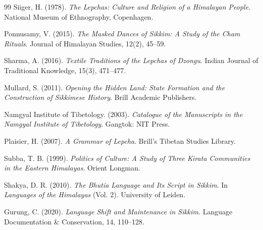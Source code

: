 \documentclass[12pt]{article}
\begin{document}
\begin{thebibliography}{99}
 Siiger, H. (1978). \textit{The Lepchas: Culture and Religion of a Himalayan People}. National Museum of Ethnography, Copenhagen.

 Ponnusamy, V. (2015). \textit{The Masked Dances of Sikkim: A Study of the Cham Rituals}. Journal of Himalayan Studies, 12(2), 45–59.

 Sharma, A. (2016). \textit{Textile Traditions of the Lepchas of Dzongu}. Indian Journal of Traditional Knowledge, 15(3), 471–477.

 Mullard, S. (2011). \textit{Opening the Hidden Land: State Formation and the Construction of Sikkimese History}. Brill Academic Publishers.

 Namgyal Institute of Tibetology. (2003). \textit{Catalogue of the Manuscripts in the Namgyal Institute of Tibetology}. Gangtok: NIT Press.

 Plaisier, H. (2007). \textit{A Grammar of Lepcha}. Brill's Tibetan Studies Library.

 Subba, T. B. (1999). \textit{Politics of Culture: A Study of Three Kirata Communities in the Eastern Himalayas}. Orient Longman.

 Shakya, D. R. (2010). \textit{The Bhutia Language and Its Script in Sikkim}. In \textit{Languages of the Himalayas} (Vol. 2). University of Leiden.

 Gurung, C. (2020). \textit{Language Shift and Maintenance in Sikkim}. Language Documentation \& Conservation, 14, 110–128.

\end{thebibliography}
\end{document}
